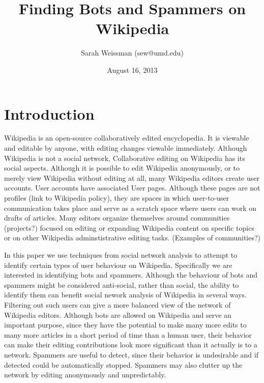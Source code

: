 \documentclass{article}
\begin{document}
\title{Finding Bots and Spammers on Wikipedia}


\author[1]{Sarah Weissman (sew@umd.edu)}

\date{August 16, 2013}

\maketitle
\begin{abstract}
\end{abstract}

\section{Introduction}

Wikipedia is an open-source collaboratively edited encyclopedia. It is viewable and editable by anyone, with editing changes viewable immediately. Although Wikipedia is not a social network, Collaborative editing on Wikipedia has its social aspects. Although it is possible to edit Wikipedia anonymously, or to merely view Wikipedia without editing at all, many Wikipedia editors create user accounts. User accounts have associated User pages. Although these pages are not profiles (link to Wikipedia policy), they are spaces in which user-to-user communication takes place and serve as a scratch space where users can work on drafts of articles. Many editors organize themselves around communities (projects?) focused on editing or expanding Wikipedia content on specific topics or on other Wikipedia adminstistrative editing tasks. (Examples of communities?)

In this paper we use techniques from social network analysis to attempt to identify certain types of user behaviour on Wikipedia. Specifically we are interested in identifying bots and spammers. Although the behaviour of bots and spammers might be considered anti-social, rather than social, the ability to identify them can benefit social nework analysis of Wikipedia in several ways. Filtering out such users can give a more balanced view of the network of Wikipedia editors. Although bots are allowed on Wikipedia and serve an important purpose, since they have the potential to make many more edits to many more articles in a short period of time than a human user, their behavior can make their editing contributions look more significant than it actually is to a network. Spammers are useful to detect, since their behavior is undesirable and if detected could be automatically stopped. Spammers may also clutter up the network by editing anonymously and unpredictably.
\end{document}
